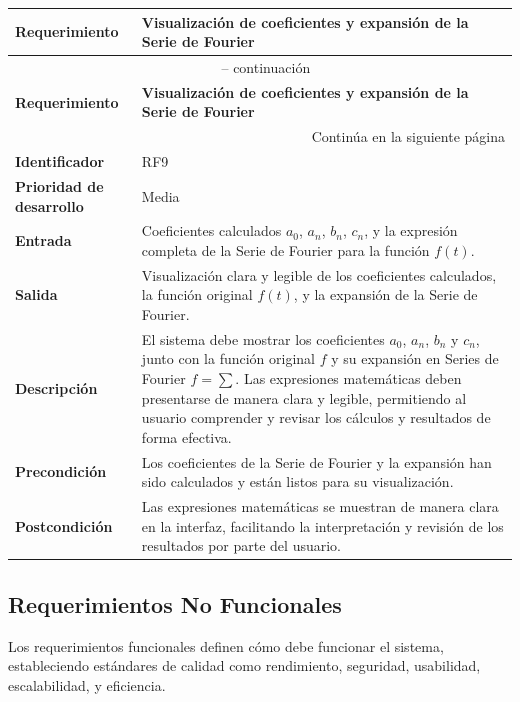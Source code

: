 \begin{longtable}{|m{3.5cm}|m{9.5cm}|}
	\hline
	\rowcolor{black!75} \color{white}\textbf{Requerimiento} & \color{white}\textbf{Visualización de coeficientes y expansión de la Serie de Fourier} \\
	\hline
	\endfirsthead
	\multicolumn{2}{c}{{\tablename\ \thetable{} -- continuación}} \\
	\hline
	\rowcolor{black!75} \color{white}\textbf{Requerimiento} & \color{white}\textbf{Visualización de coeficientes y expansión de la Serie de Fourier} \\
	\hline
	\endhead
	\hline \multicolumn{2}{r}{{Continúa en la siguiente página}} \\
	\endfoot
	\hline
	\endlastfoot
	
	\textbf{Identificador} & RF9 \\
	\hline
	\textbf{Prioridad de desarrollo} & Media \\
	\hline
	\textbf{Entrada} & Coeficientes calculados \( a_0 \), \( a_n \), \( b_n \), \( c_n \), y la expresión completa de la Serie de Fourier para la función \( f(t) \). \\
	\hline
	\textbf{Salida} & Visualización clara y legible de los coeficientes calculados, la función original \( f(t) \), y la expansión de la Serie de Fourier. \\
	\hline
	\textbf{Descripción} & El sistema debe mostrar los coeficientes \( a_0 \), \( a_n \), \( b_n \) y \( c_n \), junto con la función original \( f \) y su expansión en Series de Fourier $f = \sum$. Las expresiones matemáticas deben presentarse de manera clara y legible, permitiendo al usuario comprender y revisar los cálculos y resultados de forma efectiva. \\
	\hline
	\textbf{Precondición} & Los coeficientes de la Serie de Fourier y la expansión han sido calculados y están listos para su visualización. \\
	\hline
	\textbf{Postcondición} & Las expresiones matemáticas se muestran de manera clara en la interfaz, facilitando la interpretación y revisión de los resultados por parte del usuario. \\
	\hline
\end{longtable}
\caption{Requerimiento funcional No. 9} \label{tabla:RF9}
\vspace{0.5cm}



\subsection{Requerimientos No Funcionales}
Los requerimientos funcionales definen cómo debe funcionar el sistema, estableciendo estándares de calidad como rendimiento, seguridad, usabilidad, escalabilidad, y eficiencia.

